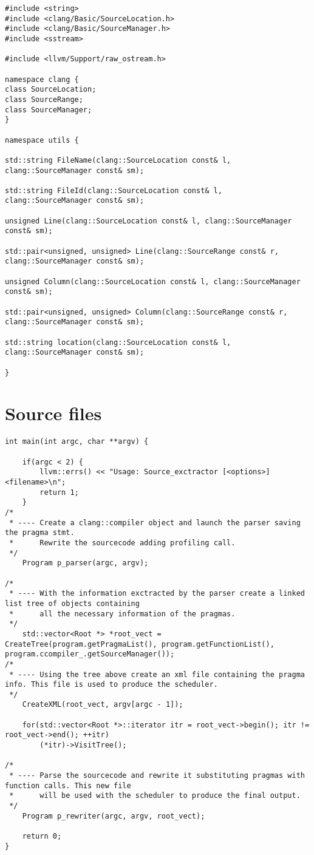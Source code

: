 \documentclass[a4paper,11pt,twoside]{book}
\begin{document}
\begin{lstlisting}[language=CCC, caption=utils/source\_locations.h]
#include <string>
#include <clang/Basic/SourceLocation.h>
#include <clang/Basic/SourceManager.h>
#include <sstream>

#include <llvm/Support/raw_ostream.h>

namespace clang {
class SourceLocation;
class SourceRange;
class SourceManager;
}

namespace utils {

std::string FileName(clang::SourceLocation const& l, clang::SourceManager const& sm);

std::string FileId(clang::SourceLocation const& l, clang::SourceManager const& sm);

unsigned Line(clang::SourceLocation const& l, clang::SourceManager const& sm);

std::pair<unsigned, unsigned> Line(clang::SourceRange const& r, clang::SourceManager const& sm);

unsigned Column(clang::SourceLocation const& l, clang::SourceManager const& sm);

std::pair<unsigned, unsigned> Column(clang::SourceRange const& r, clang::SourceManager const& sm);

std::string location(clang::SourceLocation const& l, clang::SourceManager const& sm);

}
\end{lstlisting}

\section{Source files}

\begin{lstlisting}[language=CCC, caption=main.cpp]
int main(int argc, char **argv) { 

	if(argc < 2) {
		llvm::errs() << "Usage: Source_exctractor [<options>] <filename>\n";
     	return 1;
	}
/*
 * ---- Create a clang::compiler object and launch the parser saving the pragma stmt. 
 * 		Rewrite the sourcecode adding profiling call.
 */
	Program p_parser(argc, argv);

/*
 * ---- With the information exctracted by the parser create a linked list tree of objects containing
 *		all the necessary information of the pragmas.
 */
	std::vector<Root *> *root_vect = CreateTree(program.getPragmaList(), program.getFunctionList(), program.ccompiler_.getSourceManager());
/*
 * ---- Using the tree above create an xml file containing the pragma info. This file is used to produce the scheduler.
 */
	CreateXML(root_vect, argv[argc - 1]);

	for(std::vector<Root *>::iterator itr = root_vect->begin(); itr != root_vect->end(); ++itr) 
		(*itr)->VisitTree();

/*
 * ---- Parse the sourcecode and rewrite it substituting pragmas with function calls. This new file
 * 		will be used with the scheduler to produce the final output.
 */
	Program p_rewriter(argc, argv, root_vect);

	return 0;
}
\end{lstlisting}
\end{document}
